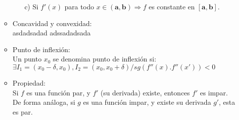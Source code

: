 \documentclass[a4paper,11pt]{report}
\begin{document}
\begin{itemize}
\begin{itemize}
\begin{itemize}
\item[c)] Si $f'(x)$ para todo $x \in \mathbf{(a,b)} \Longrightarrow f$ es constante en $\mathbf{[a,b]}$.
\end{itemize}
\item Concavidad y convexidad: \\
asdadsadad
adssadadsada
\item Punto de inflexión: \\
Un punto $x_0$ se denomina punto de inflexión si: \\
$\exists I_1 = (x_0 - \delta, x_0), I_2 = (x_0, x_0 + \delta) / sg(f''(x).f''(x'))<0$ 
\item Propiedad: \\
Si $f$ es una función par, y $f'$ (su derivada) existe, entonces $f'$ es impar. \\
De forma análoga, si $g$ es una función impar, y existe su derivada $g'$, esta es par.


\newpage



\end{itemize}
\end{itemize}
\end{document}
